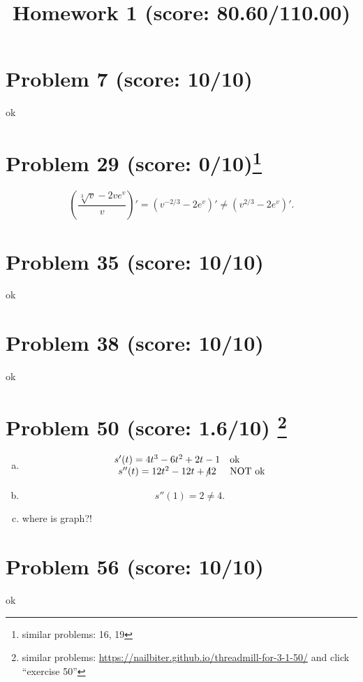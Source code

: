 \documentclass[10pt]{article} %
\title{Homework 1 (score: 80.60/110.00)}
\begin{document}
\maketitle

\section*{Problem 7 (score: 10/10)}
ok

\section*{Problem 29 (score: 0/10)\footnote{similar problems: 16, 19}}

\begin{equation*}
	\left(\frac{\sqrt[3]{v}-2ve^v}{v}  \right)'=\left( 
	v^{-2/3}-2e^v\right)'\neq \left( v^{2/3}-2e^v \right)'.
\end{equation*}

\section*{Problem 35 (score: 10/10)}
ok

\section*{Problem 38 (score: 10/10)}
ok

\section*{Problem 50 (score: 1.6/10) \footnote{similar problems: \url{https://nailbiter.github.io/threadmill-for-3-1-50/} and click ``exercise 50''}}
\begin{enumerate}[(a)]
	\item 
\begin{equation*}
	\begin{array}[]{cl}
		s'(t)=4t^3-6t^2+2t-1&\mbox{ok}\\
		s''(t)=12t^2-12t+\mbox{\xout{4}}2&\mbox{NOT ok}\\
	\end{array}
\end{equation*}
\item
	\begin{equation*}
		s''(1)=2\neq4.
	\end{equation*}
\item 
	where is graph?!
\end{enumerate}
\section*{Problem 56 (score: 10/10)}
ok
\end{document}

